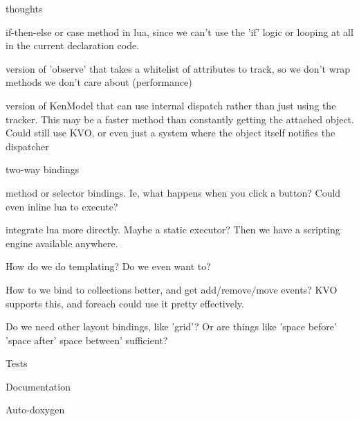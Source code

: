 
\begin{DoxyRefList}
\item[\label{todo__todo000001}%
\hypertarget{todo__todo000001}{}%
Page \hyperlink{_roadmap}{Roadmap} ]thoughts
\begin{DoxyItemize}
\item if-\/then-\/else or case method in lua, since we can't use the 'if' logic or looping at all in the current declaration code.
\item version of 'observe' that takes a whitelist of attributes to track, so we don't wrap methods we don't care about (performance)
\item version of Ken\+Model that can use internal dispatch rather than just using the tracker. This may be a faster method than constantly getting the attached object. Could still use K\+V\+O, or even just a system where the object itself notifies the dispatcher
\item two-\/way bindings
\item method or selector bindings. Ie, what happens when you click a button? Could even inline lua to execute?
\item integrate lua more directly. Maybe a static executor? Then we have a scripting engine available anywhere.
\item How do we do templating? Do we even want to?
\item How to we bind to collections better, and get add/remove/move events? K\+V\+O supports this, and foreach could use it pretty effectively.
\item Do we need other layout bindings, like 'grid'? Or are things like 'space before' 'space after' space between' sufficient?
\item Tests
\item Documentation
\item Auto-\/doxygen 
\end{DoxyItemize}
\end{DoxyRefList}